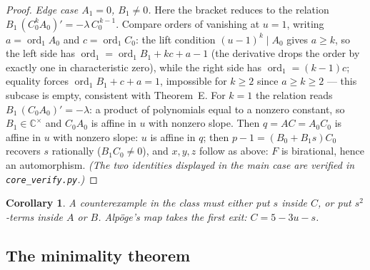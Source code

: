 \documentclass[11pt]{amsart}
\newcommand{\CC}{\mathbb{C}}
\newcommand{\Cstar}{\CC^{\times}}
\newcommand{\ord}{\operatorname{ord}}
\theoremstyle{plain}
\newtheorem{corollary}[theorem]{Corollary}
\theoremstyle{definition}
\theoremstyle{remark}
\begin{document}
\begin{proof}
\emph{Edge case $A_{1}=0$, $B_{1}\neq0$.} Here the bracket reduces to
the relation $B_{1}\,(C_{0}^{k}A_{0})'=-\lambda\,C_{0}^{\,k-1}$. Compare
orders of vanishing at $u=1$, writing $a=\ord_{1}A_{0}$ and
$c=\ord_{1}C_{0}$: the lift condition $(u-1)^{k}\mid A_{0}$ gives
$a\ge k$, so the left side has
$\ord_{1}=\ord_{1}B_{1}+kc+a-1$ (the derivative drops the order by
exactly one in characteristic zero), while the right side has
$\ord_{1}=(k-1)c$; equality forces $\ord_{1}B_{1}+c+a=1$, impossible for
$k\ge2$ since $a\ge k\ge2$ --- this subcase is empty, consistent with
Theorem~E. For $k=1$ the relation reads $B_{1}\,(C_{0}A_{0})'=-\lambda$:
a product of polynomials equal to a nonzero constant, so
$B_{1}\in\Cstar$ and $C_{0}A_{0}$ is affine in $u$ with nonzero slope.
Then $q=AC=A_{0}C_{0}$ is affine in $u$ with nonzero slope: $u$ is
affine in $q$; then $p-1=(B_{0}+B_{1}s)C_{0}$ recovers $s$ rationally
($B_{1}C_{0}\neq0$), and $x,y,z$ follow as above: $F$ is birational,
hence an automorphism. \emph{(The two identities displayed in the main
case are verified in \texttt{core\_verify.py}.)}
\end{proof}

\begin{corollary}\label{cor:exit}
A counterexample in the class must either put $s$ inside $C$, or put
$s^{2}$-terms inside $A$ or $B$. Alp\"oge's map takes the first exit:
$C=5-3u-s$.
\end{corollary}

\subsection{The minimality theorem}
\end{document}
